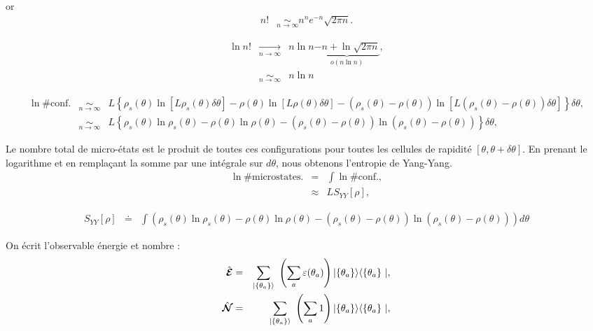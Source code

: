 	or 
	\begin{eqnarray}
		n! & \underset{n \to \infty}{\sim} n^n e^{-n} \sqrt{2\pi n}. 
	\end{eqnarray}

	\begin{eqnarray}
		\ln n! & \underset{n \to \infty}{\rightarrow} & n \ln n \underbrace{- n + \ln \sqrt{2 \pi n }}_{o \left ( n \ln n \right ) } ,\\
		&  \underset{n \to \infty}{\sim} & n \ln n  
	\end{eqnarray}

	\begin{eqnarray}
		\ln \# \mbox{conf.} & \underset{n \to \infty}{\sim}   & L \left \{ \rho_s (\theta ) \ln [ L \rho_s ( \theta ) \delta \theta ] -  \rho (\theta ) \ln [ L \rho ( \theta ) \delta \theta ] - ( \rho_s (\theta ) - \rho ( \theta ) )  \ln [ L  ( \rho_s ( \theta ) - \rho ( \theta ) )  \delta \theta ] \right \} \delta \theta ,\\
		& \underset{n \to \infty}{\sim} &  L \left \{ \rho_s (\theta ) \ln \rho_s ( \theta )   -  \rho (\theta ) \ln \rho ( \theta ) - ( \rho_s (\theta ) - \rho ( \theta ) )  \ln   ( \rho_s ( \theta ) - \rho ( \theta ) )   \right \} \delta \theta ,	
	\end{eqnarray}
	
	Le nombre total de micro-états est le produit de toutes ces configurations pour toutes les cellules de rapidité $[\theta, \theta + \delta \theta]$. En prenant le logarithme et en remplaçant la somme par une intégrale sur $d \theta $, nous obtenons l'entropie de Yang-Yang.
	\begin{eqnarray}
		\ln \# \mbox{microstates.} & = & \int \ln \# \mbox{conf.},\\
	 	& \approx  &  L S_{YY} [ \rho ] , 	
	\end{eqnarray}
	
	\begin{eqnarray}
		S_{YY}[\rho] & \doteq & \int  \left ( \rho_s (\theta ) \ln \rho_s ( \theta )   -  \rho (\theta ) \ln \rho ( \theta ) - ( \rho_s (\theta ) - \rho ( \theta ) )  \ln   ( \rho_s ( \theta ) - \rho ( \theta ) )	\right ) d \theta 
	\end{eqnarray}
	
	
	On écrit l'observable énergie et nombre :
	\begin{eqnarray}
		\operator{\mathcal{E}} & = & \sum_{ \vert \{ \theta_a\} \rangle }  \left ( \sum_a  \varepsilon ( \theta_a ) \right )   \vert \{ \theta_a\}\rangle	\langle \{ \theta_a \} \vert, \\
		\operator{\mathcal{N}} & = & \sum_{\vert \{\theta_a\} \rangle }   \left ( \sum_a  1 \right )  \vert \{ \theta_a\}\rangle	\langle \{ \theta_a \} \vert,
	\end{eqnarray}
	
